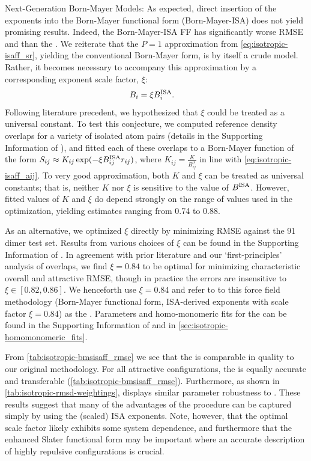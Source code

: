 \begin{subsection}{Next-Generation Born-Mayer Models: \bmsisaff}
As expected, direct insertion of the \bsisa exponents into the
Born-Mayer functional form (Born-Mayer-ISA) does not yield promising results.
Indeed, the Born-Mayer-ISA FF has significantly worse RMSE and \mse than
the \saptff. 
We reiterate that the $P = 1$ approximation from \cref{eq:isotropic-isaff_sr}, yielding the
conventional Born-Mayer form, is by itself a crude model.
Rather, it becomes necessary to accompany this approximation by a
corresponding exponent scale factor, $\xi$:
%
\begin{align}
\label{eq:isotropic-bmsisaff_bi}
B_i &= \xi B^{\text{ISA}}_{i}.
\end{align}
%
Following literature precedent, 
\cite{Ihm1990, McDaniel2012}
we hypothesized that $\xi$ could be treated as a
universal constant. To test this conjecture, we computed reference density overlaps for a
variety of isolated atom pairs (details in the Supporting Information of
), and
fitted each of these overlaps to a Born-Mayer function of the form 
$S_{ij} \approx K_{ij}\exp(-\xi B^{\text{ISA}}_{ij} r_{ij})$, where $K_{ij} =
\frac{K}{B^{3}_{ij}}$ in line with \cref{eq:isotropic-isaff_aij}. To very good
approximation, both $K$ and $\xi$ can be treated as universal constants;
that is, neither $K$ nor $\xi$ is sensitive to the value of $B^{\text{ISA}}_{}$.
However, fitted values of $K$ and $\xi$ do depend strongly on the range of \R values
used in the optimization, yielding estimates ranging from 0.74 to 0.88.

As an alternative, we optimized $\xi$ directly by minimizing RMSE
against the 91 dimer test set. Results from various choices
of $\xi$ can be found in the Supporting Information of .  In agreement
with prior literature and our `first-principles' analysis of overlaps, we find $\xi
= 0.84$ to be optimal for minimizing characteristic overall and attractive RMSE,
though in practice the errors are insensitive to $\xi \in [0.82,0.86]$.
We henceforth use $\xi=0.84$ and refer to to this force field methodology
(Born-Mayer functional form, ISA-derived exponents with
scale factor $\xi=0.84$) as the \bmsisaff. 
Parameters and homo-monomeric fits for the \bmsisaff
can be found in the Supporting Information of  and in
\cref{sec:isotropic-homomonomeric_fits}.
 
From \cref{tab:isotropic-bmsisaff_rmse} we see that the \bmsisaff is comparable in
quality to our original \isaffold methodology. 
For all attractive configurations, the \bmsisaff is equally
accurate and transferable (\cref{tab:isotropic-bmsisaff_rmse}). Furthermore, as shown in
\cref{tab:isotropic-rmsd-weightings}, \bmsisaff displays similar parameter robustness
to \isaffold. These results suggest that many of the advantages of the \isaffold
procedure can be captured simply by using the (scaled) ISA exponents.
Note, however, that the optimal scale factor likely exhibits some system dependence,
and furthermore that the enhanced Slater functional form may be important
where an accurate description of highly repulsive configurations is crucial.


\end{subsection}

